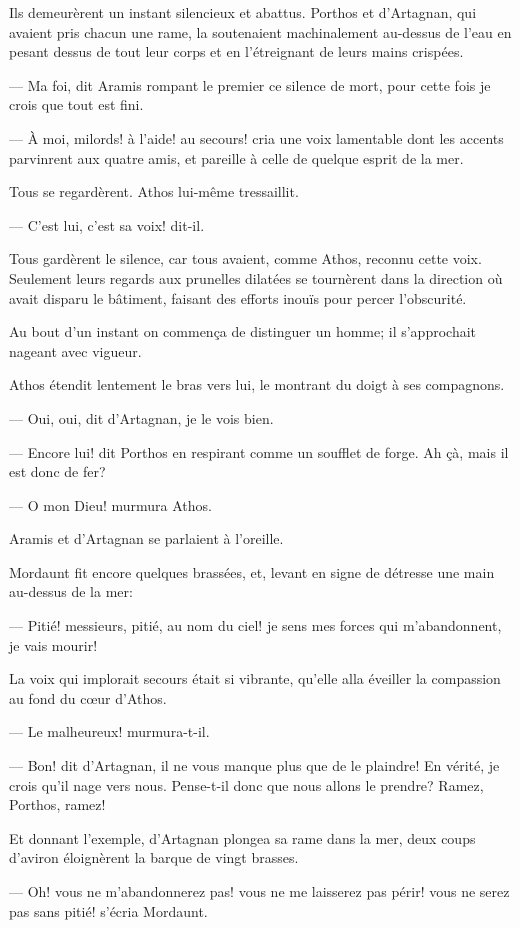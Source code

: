 Ils demeurèrent un instant silencieux et abattus. Porthos et d'Artagnan, qui avaient pris chacun une rame, la soutenaient machinalement au-dessus de l'eau en pesant dessus de tout leur corps et en l'étreignant de leurs mains crispées.

— Ma foi, dit Aramis rompant le premier ce silence de mort, pour cette fois je crois que tout est fini.

— À moi, milords! à l'aide! au secours! cria une voix lamentable dont les accents parvinrent aux quatre amis, et pareille à celle de quelque esprit de la mer.

Tous se regardèrent. Athos lui-même tressaillit.

— C'est lui, c'est sa voix! dit-il.

Tous gardèrent le silence, car tous avaient, comme Athos, reconnu cette voix. Seulement leurs regards aux prunelles dilatées se tournèrent dans la direction où avait disparu le bâtiment, faisant des efforts inouïs pour percer l'obscurité.

Au bout d'un instant on commença de distinguer un homme; il s'approchait nageant avec vigueur.

Athos étendit lentement le bras vers lui, le montrant du doigt à ses compagnons.

— Oui, oui, dit d'Artagnan, je le vois bien.

— Encore lui! dit Porthos en respirant comme un soufflet de forge. Ah çà, mais il est donc de fer?

— O mon Dieu! murmura Athos.

Aramis et d'Artagnan se parlaient à l'oreille.

Mordaunt fit encore quelques brassées, et, levant en signe de détresse une main au-dessus de la mer:

— Pitié! messieurs, pitié, au nom du ciel! je sens mes forces qui m'abandonnent, je vais mourir!

La voix qui implorait secours était si vibrante, qu'elle alla éveiller la compassion au fond du cœur d'Athos.

— Le malheureux! murmura-t-il.

— Bon! dit d'Artagnan, il ne vous manque plus que de le plaindre! En vérité, je crois qu'il nage vers nous. Pense-t-il donc que nous allons le prendre? Ramez, Porthos, ramez!

Et donnant l'exemple, d'Artagnan plongea sa rame dans la mer, deux coups d'aviron éloignèrent la barque de vingt brasses.

— Oh! vous ne m'abandonnerez pas! vous ne me laisserez pas périr! vous ne serez pas sans pitié! s'écria Mordaunt.

